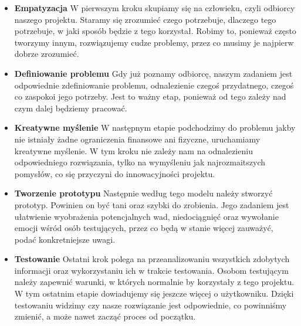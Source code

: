 \documentclass[a4paper,titleauthor]{mwart}
\begin{document}
 \begin{itemize}
     \item \textbf {Empatyzacja}\newline \newline
     W pierwszym kroku skupiamy się na człowieku, czyli odbiorcy naszego projektu. Staramy się zrozumieć czego potrzebuje, dlaczego tego potrzebuje, w jaki sposób będzie z tego korzystał. Robimy to, ponieważ często tworzymy innym, rozwiązujemy cudze problemy, przez co musimy je najpierw dobrze zrozumieć. \newline
     \item \textbf{Definiowanie problemu}\newline \newline
     Gdy już poznamy odbiorcę, naszym zadaniem jest odpowiednie zdefiniowanie problemu, odnalezienie czegoś przydatnego, czegoś co zaspokoi jego potrzeby. Jest to ważny etap, ponieważ od tego zależy nad czym dalej będziemy pracować.\newline \newline
     \item\textbf{Kreatywne myślenie}\newline \newline
     W następnym etapie podchodzimy do problemu jakby nie istniały żadne ograniczenia finansowe ani fizyczne, uruchamiamy kreatywne myślenie. W tym kroku nie zależy nam na odnalezieniu odpowiedniego rozwiązania, tylko na wymyśleniu jak najrozmaitszych pomysłów, co się przyczyni do innowacyjności projektu.\newline
     \item\textbf{Tworzenie prototypu}\newline \newline
     Następnie według tego modelu należy stworzyć prototyp. Powinien on być tani oraz szybki do zrobienia. Jego zadaniem jest ułatwienie wyobrażenia potencjalnych wad, niedociągnięć oraz wywołanie emocji wśród osób testujących, przez co będą w stanie więcej zauważyć, podać konkretniejsze uwagi.\newline
     \item\textbf{Testowanie}\newline \newline
     Ostatni krok polega na przeanalizowaniu wszystkich zdobytych informacji oraz wykorzystaniu ich w trakcie testowania. Osobom testującym należy zapewnić warunki, w których normalnie by korzystały z tego projektu. W tym ostatnim etapie dowiadujemy się jeszcze więcej o użytkowniku. Dzięki testowaniu widzimy czy nasze rozwiązanie jest odpowiednie, co powinniśmy zmienić, a może nawet zacząć proces od początku.
 \end{itemize}
\end{document}
